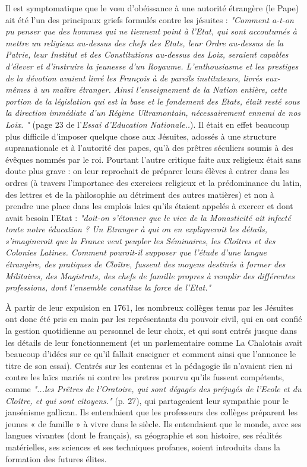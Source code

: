 Il est symptomatique que le vœu d'obéissance à une autorité étrangère (le Pape) ait été l'un des principaux griefs formulés contre les jésuites :
  \emph{"Comment a-t-on pu penser que des hommes qui ne tiennent point à l'Etat, qui sont accoutumés à mettre un religieux au-dessus des chefs des Etats, leur Ordre au-dessus de la Patrie, leur Institut et des Constitutions au-dessus des Loix, seraient capables d'élever et d'instruire la jeunesse d'un Royaume. L'enthousiasme et les prestiges de la dévotion avaient livré les François à de pareils instituteurs, livrés eux-mêmes à un maître étranger. Ainsi l'enseignement de la Nation entière, cette portion de la législation qui est la base et le fondement des Etats, était resté sous la direction immédiate d'un Régime Ultramontain, nécessairement ennemi de nos Loix. "} (page 23 de l'\emph{Essai d'Education Nationale..}).  Il était en effet beaucoup plus difficile d'imposer quelque chose aux Jésuites, adossés à une structure supranationale et à l'autorité des papes, qu'à des prêtres séculiers soumis à des évêques nommés par le roi. Pourtant l'autre critique faite aux religieux était sans doute plus grave : on leur reprochait de préparer leurs élèves à entrer dans les ordres (à travers l'importance des exercices religieux et la prédominance du latin, des lettres et de la philosophie au détriment des autres matières) et non à prendre une place dans les emplois laïcs qu'ils étaient appelés à exercer et dont avait besoin l'Etat : \emph{"doit-on s'étonner que le vice de la Monasticité ait infecté toute notre éducation ? Un Etranger à qui on en expliqueroit les détails, s'imagineroit que la France veut peupler les Séminaires, les Cloîtres et des Colonies Latines. Comment pouroit-il supposer que l'étude d'une langue étrangère, des pratiques de Cloître, fussent des moyens destinés à former des Militaires, des Magistrats, des chefs de famille propres à remplir des différentes professions, dont l'ensemble constitue la force de l'Etat."}
 
 À partir de leur expulsion en 1761, les nombreux collèges tenus par les Jésuites ont donc été pris en main par les représentants du pouvoir civil, qui en ont confié la gestion quotidienne au personnel de leur choix, et qui sont entrés jusque dans les détails de leur fonctionnement (et un parlementaire comme La Chalotais avait beaucoup d'idées sur ce qu'il fallait enseigner et comment ainsi que l'annonce le titre de son essai). Centrés sur les contenus et la pédagogie ils n'avaient rien ni contre les laïcs mariés ni contre les pretres pourvu qu'ils fussent compétents, comme \emph{"...les Prêtres de l'Oratoire, qui sont dégagés des préjugés de l'Ecole et du Cloître, et qui sont citoyens."} (p. 27), qui partageaient leur sympathie pour le jansénisme gallican. Ils entendaient que les professeurs des collèges préparent les jeunes « de famille » à vivre dans le siècle. Ils entendaient que le monde, avec ses langues vivantes (dont le français), sa géographie et son histoire, ses réalités matérielles, ses sciences et ses techniques profanes, soient introduits dans la formation des futures élites. 



